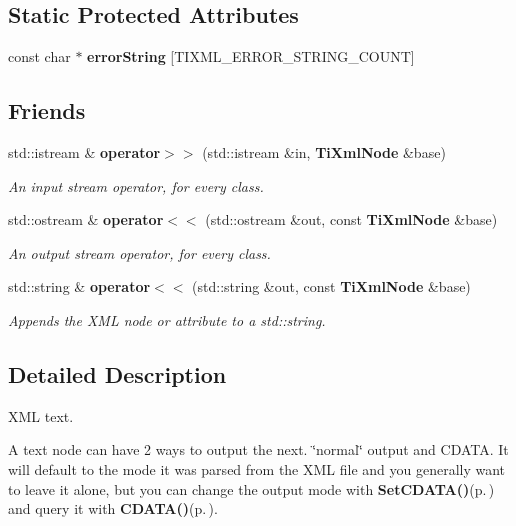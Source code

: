 \subsection*{Static Protected Attributes}
\begin{CompactItemize}
\item 
const char $\ast$ {\bf error\-String} [TIXML\_\-ERROR\_\-STRING\_\-COUNT]
\end{CompactItemize}
\subsection*{Friends}
\begin{CompactItemize}
\item 
std::istream \& {\bf operator$>$$>$} (std::istream \&in, {\bf Ti\-Xml\-Node} \&base)
\begin{CompactList}\small\item\em An input stream operator, for every class. \item\end{CompactList}\item 
std::ostream \& {\bf operator$<$$<$} (std::ostream \&out, const {\bf Ti\-Xml\-Node} \&base)
\begin{CompactList}\small\item\em An output stream operator, for every class. \item\end{CompactList}\item 
std::string \& {\bf operator$<$$<$} (std::string \&out, const {\bf Ti\-Xml\-Node} \&base)\label{classTiXmlNode_TiXmlUnknownn2}

\begin{CompactList}\small\item\em Appends the XML node or attribute to a std::string. \item\end{CompactList}\end{CompactItemize}


\subsection{Detailed Description}
XML text. 

A text node can have 2 ways to output the next. \char`\"{}normal\char`\"{} output and CDATA. It will default to the mode it was parsed from the XML file and you generally want to leave it alone, but you can change the output mode with {\bf Set\-CDATA()}{\rm (p.\,\pageref{classTiXmlText_TiXmlTexta7})} and query it with {\bf CDATA()}{\rm (p.\,\pageref{classTiXmlText_TiXmlTexta6})}. 



